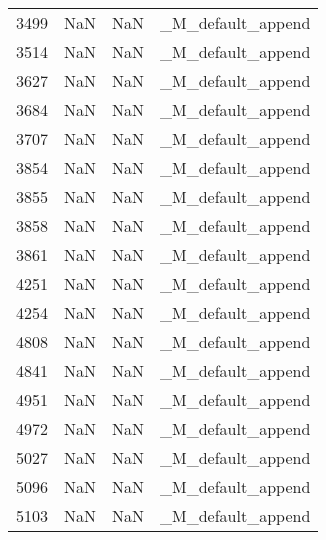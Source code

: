 \begin{tabular}{llll}
3499 &                   NaN &                        NaN &                         \_M\_default\_append \\
3514 &                   NaN &                        NaN &                         \_M\_default\_append \\
3627 &                   NaN &                        NaN &                         \_M\_default\_append \\
3684 &                   NaN &                        NaN &                         \_M\_default\_append \\
3707 &                   NaN &                        NaN &                         \_M\_default\_append \\
3854 &                   NaN &                        NaN &                         \_M\_default\_append \\
3855 &                   NaN &                        NaN &                         \_M\_default\_append \\
3858 &                   NaN &                        NaN &                         \_M\_default\_append \\
3861 &                   NaN &                        NaN &                         \_M\_default\_append \\
4251 &                   NaN &                        NaN &                         \_M\_default\_append \\
4254 &                   NaN &                        NaN &                         \_M\_default\_append \\
4808 &                   NaN &                        NaN &                         \_M\_default\_append \\
4841 &                   NaN &                        NaN &                         \_M\_default\_append \\
4951 &                   NaN &                        NaN &                         \_M\_default\_append \\
4972 &                   NaN &                        NaN &                         \_M\_default\_append \\
5027 &                   NaN &                        NaN &                         \_M\_default\_append \\
5096 &                   NaN &                        NaN &                         \_M\_default\_append \\
5103 &                   NaN &                        NaN &                         \_M\_default\_append \\

\end{tabular}
